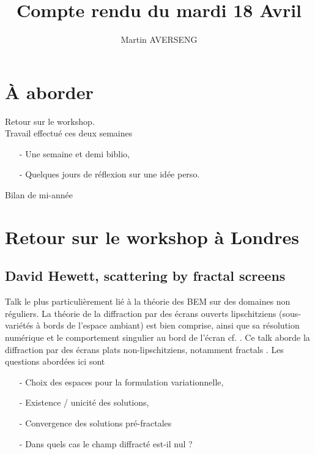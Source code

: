 \documentclass[11pt,a4paper]{article}
\author{Martin AVERSENG}
\title{Compte rendu du mardi 18 Avril}
\begin{document}
\maketitle

\section{À aborder}

Retour sur le workshop. \\
Travail effectué ces deux semaines
\begin{itemize}
\item[-] Une semaine et demi biblio, 
\item[-] Quelques jours de réflexion sur une idée perso. 
\end{itemize}
Bilan de mi-année


\section{Retour sur le workshop à Londres}

\subsection{David Hewett, scattering by fractal screens}

Talk le plus particulièrement lié à la théorie des BEM sur des domaines non réguliers. 
La théorie de la diffraction par des écrans ouverts lipschitziens (sous-variétés à bords de l'espace ambiant) est bien comprise, ainsi que sa résolution numérique et le comportement singulier au bord de l'écran cf. \cite{hsiao1985integral,stephan1987boundary}. 
Ce talk aborde la diffraction par des écrans plats non-lipschitziens, notamment fractals . Les questions abordées ici sont 
\begin{itemize}
\item[-] Choix des espaces pour la formulation variationnelle, 
\item[-] Existence / unicité des solutions,
\item[-] Convergence des solutions pré-fractales
\item[-] Dans quels cas le champ diffracté est-il nul ?
\end{itemize}
\end{document}
